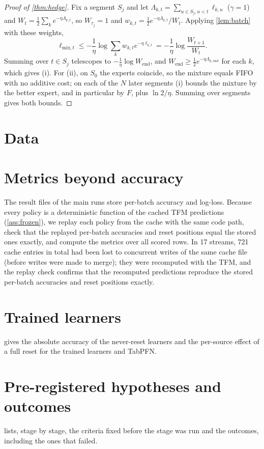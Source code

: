 \documentclass[10pt]{article}
\theoremstyle{definition}
\theoremstyle{remark}
\begin{document}
\begin{proof}[Proof of \cref{thm:hedge}]
Fix a segment $S_j$ and let $\Lambda_{k,t}=\sum_{u\in S_j,u<t}\ell_{k,u}$ ($\gamma=1$) and
$W_t=\frac12\sum_k e^{-\eta\Lambda_{k,t}}$, so $W_{\tau_j}=1$ and $w_{k,t}=\frac12e^{-\eta\Lambda_{k,t}}/W_t$. Applying
\cref{lem:batch} with these weights,
\begin{equation}
  \ell_{\mathrm{mix},t}\le-\frac1\eta\log\sum_k w_{k,t}e^{-\eta\ell_{k,t}}=-\frac1\eta\log\frac{W_{t+1}}{W_t}.
\end{equation}
Summing over $t\in S_j$ telescopes to $-\frac1\eta\log W_{\mathrm{end}}$, and
$W_{\mathrm{end}}\ge\frac12e^{-\eta\Lambda_{k,\mathrm{end}}}$ for each $k$, which gives (i). For (ii), on $S_0$ the
experts coincide, so the mixture equals FIFO with no additive cost; on each of the $N$ later segments (i) bounds the
mixture by the better expert, and in particular by $F$, plus $\ln2/\eta$. Summing over segments gives both bounds.
\end{proof}

\section{Data}
\label{app:data}




\section{Metrics beyond accuracy}
\label{app:metrics}
The result files of the main runs store per-batch accuracy and log-loss. Because every policy is a deterministic
function of the cached TFM predictions (\cref{ass:frozen}), we replay each policy from the cache with the same code
path, check that the replayed per-batch accuracies and reset positions equal the stored ones exactly, and compute the
metrics over all scored rows. In 17 streams, 721 cache entries in total had been lost to concurrent writes of the same
cache file (before writes were made to merge); they were recomputed with the TFM, and the replay check confirms that
the recomputed predictions reproduce the stored per-batch accuracies and reset positions exactly.

\clearpage
\section{Trained learners}
\label{app:learners}
 gives the absolute accuracy of the never-reset learners and the per-source effect of a full
reset for the trained learners and TabPFN.



\clearpage
\section{Pre-registered hypotheses and outcomes}
\label{app:prereg}
 lists, stage by stage, the criteria fixed before the stage was run and the outcomes, including the
ones that failed.


\end{document}
